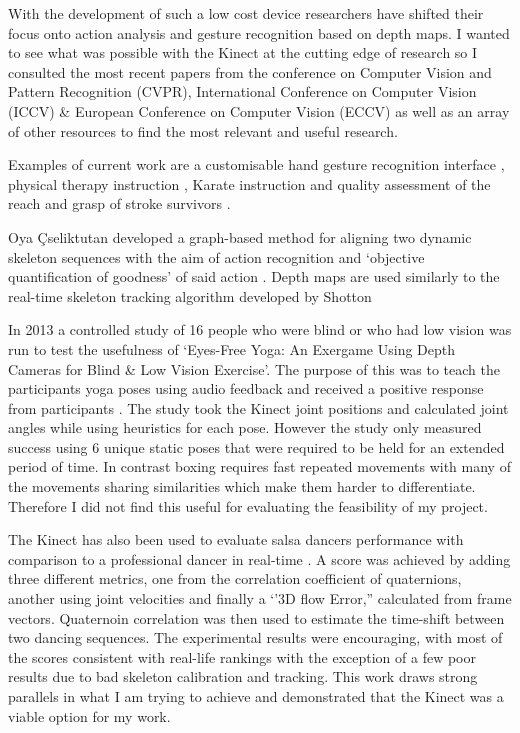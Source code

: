 With the development of such a low cost device researchers have shifted their focus onto action analysis and gesture recognition based on depth maps. I wanted to see what was possible with the Kinect at the cutting edge of research so I consulted the most recent papers from the conference on Computer Vision and Pattern Recognition (CVPR), International Conference on Computer Vision (ICCV) \& European Conference on Computer Vision (ECCV) as well as an array of other resources to find the most relevant and useful research. 

Examples of current work are a customisable hand gesture recognition interface \cite{chr}, physical therapy instruction \cite{physio}\cite{Kinect2012}, Karate instruction \cite{karate} and quality assessment of the reach and grasp of stroke survivors \cite{rehab}.

Oya \c{C}seliktutan developed a graph-based method for aligning two dynamic skeleton sequences with the aim of action recognition and `objective quantification of goodness' of said action \cite{Celiktutan2013a}.  Depth maps are used similarly to the real-time skeleton tracking algorithm developed by Shotton \cite{Shotton2011. }


In 2013 a controlled study of 16 people who were blind or who had low vision was run to test the usefulness of `Eyes-Free Yoga: An Exergame Using Depth Cameras for Blind \& Low Vision Exercise'. The purpose of this was to teach the participants yoga poses using audio feedback and received a positive response from participants \cite{Rector2013}. The study took the Kinect joint positions and calculated joint angles while using heuristics for each pose. However the study only measured success using 6 unique static poses that were required to be held for an extended period of time. In contrast boxing requires fast repeated movements with many of the movements sharing similarities which make them harder to differentiate. Therefore I did not find this useful for evaluating the feasibility of my project.

The Kinect has also been used to evaluate salsa dancers performance with comparison to a professional dancer in real-time \cite{Alexiadis2011}\cite{vdpe}. A score was achieved by adding three different metrics, one from the correlation coefficient of quaternions, another using joint velocities and finally a `'3D flow Error,'' calculated from frame vectors. Quaternoin correlation was then used to estimate the time-shift between two dancing sequences.\newline
The experimental results were encouraging, with most of the scores consistent with real-life rankings with the exception of a few poor results due to bad skeleton calibration and tracking. This work draws strong parallels in what I am trying to achieve and demonstrated that the Kinect was a viable option for my work.

